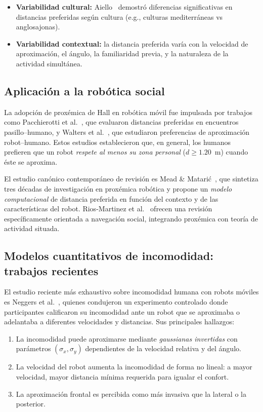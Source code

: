 \documentclass[12pt,a4paper,oneside]{book}
\begin{document}
\begin{itemize}
    \item \textbf{Variabilidad cultural:} Aiello~\cite{Aiello1987,AielloAiello1974} demostró diferencias significativas en distancias preferidas según cultura (e.g., culturas mediterráneas vs anglosajonas).
    \item \textbf{Variabilidad contextual:} la distancia preferida varía con la velocidad de aproximación, el ángulo, la familiaridad previa, y la naturaleza de la actividad simultánea.
\end{itemize}

\subsection{Aplicación a la robótica social}

La adopción de proxémica de Hall en robótica móvil fue impulsada por trabajos como Pacchierotti et al.~\cite{Pacchierotti2005}, que evaluaron distancias preferidas en encuentros pasillo--humano, y Walters et al.~\cite{Walters2005}, que estudiaron preferencias de aproximación robot--humano. Estos estudios establecieron que, en general, los humanos prefieren que un robot \emph{respete al menos su zona personal} ($d \geq 1.20$~m) cuando éste se aproxima.

El estudio canónico contemporáneo de revisión es Mead \& Matarić~\cite{Mead2017}, que sintetiza tres décadas de investigación en proxémica robótica y propone un \emph{modelo computacional} de distancia preferida en función del contexto y de las características del robot. Rios-Martinez et al.~\cite{RiosMartinez2015} ofrecen una revisión específicamente orientada a navegación social, integrando proxémica con teoría de actividad situada.

\subsection{Modelos cuantitativos de incomodidad: trabajos recientes}

El estudio reciente más exhaustivo sobre incomodidad humana con robots móviles es Neggers et al.~\cite{Neggers2024,Neggers2022}, quienes condujeron un experimento controlado donde participantes calificaron su incomodidad ante un robot que se aproximaba o adelantaba a diferentes velocidades y distancias. Sus principales hallazgos:

\begin{enumerate}[leftmargin=*]
    \item La incomodidad puede aproximarse mediante \emph{gaussianas invertidas} con parámetros $(\sigma_x, \sigma_y)$ dependientes de la velocidad relativa y del ángulo.
    \item La velocidad del robot aumenta la incomodidad de forma no lineal: a mayor velocidad, mayor distancia mínima requerida para igualar el confort.
    \item La aproximación frontal es percibida como más invasiva que la lateral o la posterior.
\end{enumerate}
\end{document}
